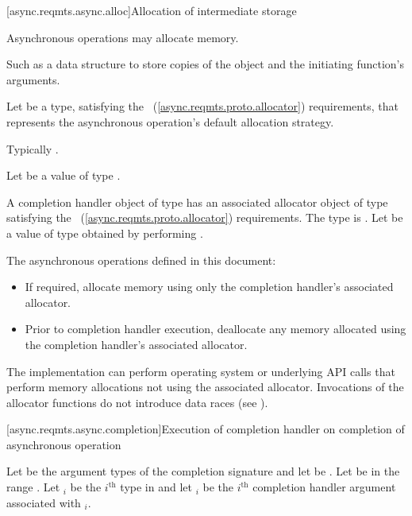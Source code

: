 [async.reqmts.async.alloc]{Allocation of intermediate storage}

\pnum
Asynchronous operations may allocate memory. \begin{note} Such as a data structure to store copies of the  object and the initiating function's arguments. \end{note}

\pnum
Let  be a type, satisfying the ~(\ref{async.reqmts.proto.allocator}) requirements, that represents the asynchronous operation's default allocation strategy. \begin{note} Typically . \end{note} Let  be a value of type .

\pnum
A completion handler object of type  has an associated allocator object  of type  satisfying the ~(\ref{async.reqmts.proto.allocator}) requirements. The type  is . Let  be a value of type  obtained by performing .

\pnum
 The asynchronous operations defined in this document:

\begin{itemize}
\item
If required, allocate memory using only the completion handler's associated allocator.

\item
Prior to completion handler execution, deallocate any memory allocated using the completion handler's associated allocator.
\end{itemize}

\pnum
 \begin{note} The implementation can perform operating system or underlying API calls that perform memory allocations not using the associated allocator. Invocations of the allocator functions do not introduce data races (see ). \end{note}



[async.reqmts.async.completion]{Execution of completion handler on completion of asynchronous operation}

\pnum
Let  be the argument types of the completion signature  and let  be . Let  be in the range . Let $_i$ be the $i^\text{th}$ type in  and let $_i$ be the $i^\text{th}$ completion handler argument associated with $_i$.

